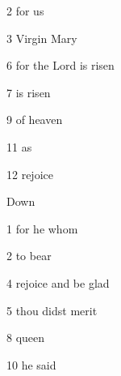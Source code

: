 \item{2}{	for us} 
\item{3}{	Virgin Mary} 
\item{6}{	for the Lord is risen} 
\item{7}{	is risen} 
\item{9}{	of heaven} 
\item{11}{	as} 
\item{12}{	rejoice} 

\noindent Down 

\item{1}{	for he whom} 
\item{2}{	to bear} 
\item{4}{	rejoice and be glad} 
\item{5}{	thou didst merit} 
\item{8}{	queen} 
\item{10}{	he said} 
\bye